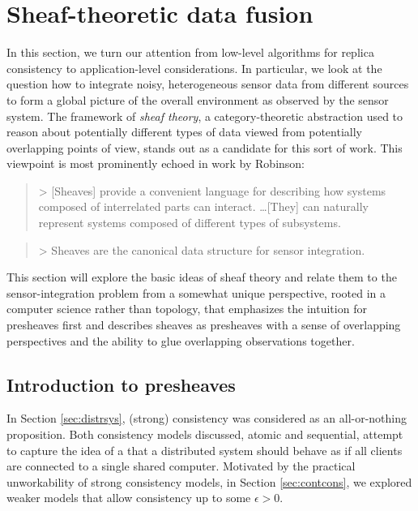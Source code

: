 \section{Sheaf-theoretic data fusion}
\label{sec:sheaf}

In this section, we turn our attention from low-level algorithms for
replica consistency to application-level considerations. In
particular, we look at the question how to integrate noisy,
heterogeneous sensor data from different sources to form a global
picture of the overall environment as observed by the sensor
system. The framework of \emph{sheaf theory}, a category-theoretic
abstraction used to reason about potentially different types of data
viewed from potentially overlapping points of view, stands out as a
candidate for this sort of work. This viewpoint is most prominently
echoed in work by Robinson:

\begin{quote}
>   [Sheaves] provide a convenient language for describing how systems composed of interrelated parts can interact. \ldots [They] can naturally represent systems composed of different types of subsystems. \cite{2020robinsonPseudometric}
\end{quote}
\begin{quote}
>   Sheaves are the canonical data structure for sensor integration. \cite{2017robinsonCanonical}
\end{quote}
This section will explore the basic ideas of sheaf theory and relate them to the sensor-integration problem from a somewhat unique perspective, rooted in a computer science rather than topology, that emphasizes the intuition for presheaves first and describes sheaves as presheaves with a sense of overlapping perspectives and the ability to glue overlapping observations together.

\subsection{Introduction to presheaves}

In Section \ref{sec:distrsys}, (strong) consistency was considered as
an all-or-nothing proposition. Both consistency models discussed,
atomic and sequential, attempt to capture the idea of a
that a distributed system should behave as if all clients are
connected to a single shared computer. Motivated by the practical
unworkability of strong consistency models, in Section
\ref{sec:contcons}, we explored weaker models that allow consistency
up to some $\epsilon > 0$.


